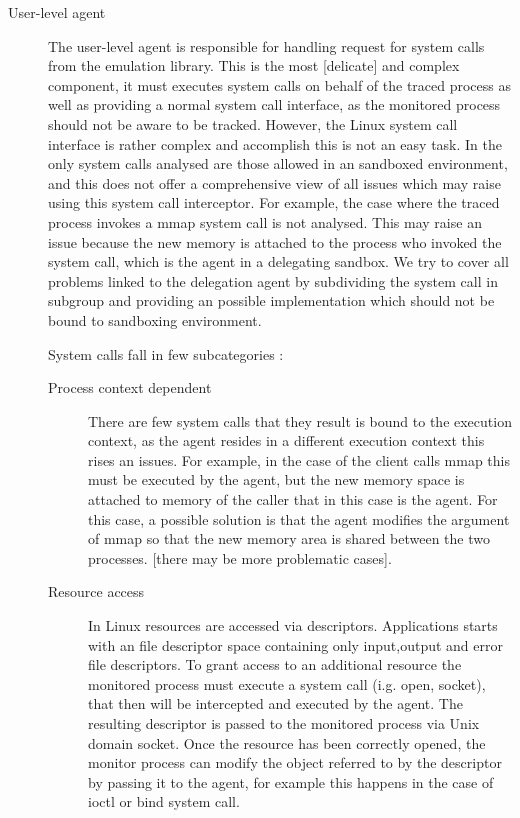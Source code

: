 \begin{description}
	\item[User-level agent]  The user-level agent is responsible for handling request for system calls from the emulation library. This is the most [delicate] and complex 
							 component, it must executes system calls on behalf of the traced process as well as providing a normal system call interface, as the monitored
							 process should not be aware to be tracked. However, the Linux system call interface is rather complex and accomplish this is not an easy task. 
							 In \cite{Garfinkel03ostia:a} the only system calls analysed are those  allowed in an sandboxed environment, and this does not offer a
							 comprehensive view of all issues which may raise using this system call interceptor. For example, the case where the traced process invokes a mmap 
							 system call is not analysed. This may raise an issue because the new memory is attached to the process who invoked the system call, which is the 
							 agent in a delegating sandbox. We try to cover all problems linked to the delegation agent by subdividing the system call in subgroup and providing
							  an possible implementation which should not be bound to sandboxing environment. 
							 
							 System calls fall in few subcategories : 
							 
							 \begin{description}
							 \item[Process context dependent] There are few system calls that they result is bound to the execution context, as the agent resides in a different 
							 								  execution context this rises an issues. For example, in the case of the client calls mmap this must be executed 
							 								  by the agent, but the new memory space is attached to memory of the caller that in this case is the agent. 
							 								  For this case, a possible solution is that the agent modifies the argument of mmap so that the new memory area 
							 								  is shared between the two processes. [there may be more problematic cases].   
							 								
							 \item[Resource access] In Linux resources are accessed via descriptors. Applications starts with an file descriptor space containing only
							 						input,output and error file descriptors. To grant access to an additional resource the monitored process must execute a 
							 						system call (i.g. open, socket), that then will be intercepted and executed by the agent. The resulting descriptor is
							 						passed to the monitored process via Unix domain socket. Once the resource has been correctly opened, the monitor process 
							 						can modify the object referred to by the descriptor by passing it to the agent, for example this happens in the case of 
							 						ioctl or bind system call. 
							 						

\end{description}
\end{description}
